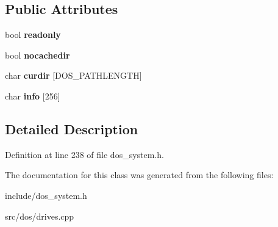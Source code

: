 \subsection*{Public Attributes}
\begin{DoxyCompactItemize}
\item 
\hypertarget{classDOS__Drive_aa7a3f21acf8787c1bad16d2c4fb5c53c}{bool {\bfseries readonly}}\label{classDOS__Drive_aa7a3f21acf8787c1bad16d2c4fb5c53c}

\item 
\hypertarget{classDOS__Drive_ab8a268c6350773fa0e8b8c000b691447}{bool {\bfseries nocachedir}}\label{classDOS__Drive_ab8a268c6350773fa0e8b8c000b691447}

\item 
\hypertarget{classDOS__Drive_a781fd315606de345f8eab325c2a17c2e}{char {\bfseries curdir} \mbox{[}D\-O\-S\-\_\-\-P\-A\-T\-H\-L\-E\-N\-G\-T\-H\mbox{]}}\label{classDOS__Drive_a781fd315606de345f8eab325c2a17c2e}

\item 
\hypertarget{classDOS__Drive_a3e2b1d7526c099ba38ba991b9d2623e1}{char {\bfseries info} \mbox{[}256\mbox{]}}\label{classDOS__Drive_a3e2b1d7526c099ba38ba991b9d2623e1}

\end{DoxyCompactItemize}


\subsection{Detailed Description}


Definition at line 238 of file dos\-\_\-system.\-h.



The documentation for this class was generated from the following files\-:\begin{DoxyCompactItemize}
\item 
include/dos\-\_\-system.\-h\item 
src/dos/drives.\-cpp\end{DoxyCompactItemize}

